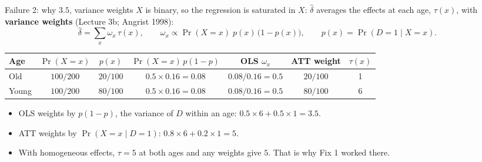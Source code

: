 \documentclass[
  11pt,
  ignorenonframetext,
  aspectratio=169,
]{beamer}
\providecommand{\tightlist}{%
  \setlength{\itemsep}{0pt}\setlength{\parskip}{0pt}}
\begin{document}
\begin{frame}{Failure 2: why \(3.5\), variance weights}
\protect{}\label{failure-2-why-3.5-variance-weights}
\(X\) is binary, so the regression is saturated in \(X\): \(\hat\delta\)
averages the effects at each age, \(\tau(x)\), with \textbf{variance
weights} (Lecture 3b; Angrist 1998): \[
\hat\delta = \sum_x \omega_x\, \tau(x), \qquad \omega_x \propto \Pr(X = x)\; p(x)\,\big(1 - p(x)\big), \qquad p(x) = \Pr(D = 1 \mid X = x).
\]

\begin{center}\small
\begin{tabular}{lcccccc}
\toprule
Age & $\Pr(X = x)$ & $p(x)$ & $\Pr(X = x)\, p(1-p)$ & OLS $\omega_x$ & ATT weight & $\tau(x)$ \\
\midrule
Old & $100/200$ & $20/100$ & $0.5 \times 0.16 = 0.08$ & $0.08/0.16 = 0.5$ & $20/100$ & 1 \\
Young & $100/200$ & $80/100$ & $0.5 \times 0.16 = 0.08$ & $0.08/0.16 = 0.5$ & $80/100$ & 6 \\
\bottomrule
\end{tabular}
\end{center}

\begin{itemize}
\tightlist
\item
  OLS weights by \(p(1-p)\), the variance of \(D\) within an age:
  \(0.5 \times 6 + 0.5 \times 1 = 3.5\).
\item
  ATT weights by \(\Pr(X = x \mid D=1)\):
  \(0.8 \times 6 + 0.2 \times 1 = 5\).
\item
  With homogeneous effects, \(\tau = 5\) at both ages and any weights
  give \(5\). That is why Fix 1 worked there.
\end{itemize}
\end{frame}
\end{document}
